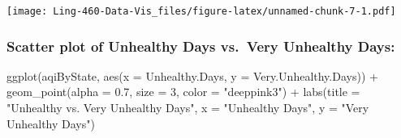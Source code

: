 \documentclass[
]{article}
\newenvironment{Shaded}{\begin{snugshade}}{\end{snugshade}}
\newcommand{\AttributeTok}[1]{\textcolor[rgb]{0.77,0.63,0.00}{#1}}
\newcommand{\DecValTok}[1]{\textcolor[rgb]{0.00,0.00,0.81}{#1}}
\newcommand{\FloatTok}[1]{\textcolor[rgb]{0.00,0.00,0.81}{#1}}
\newcommand{\FunctionTok}[1]{\textcolor[rgb]{0.00,0.00,0.00}{#1}}
\newcommand{\NormalTok}[1]{#1}
\newcommand{\OtherTok}[1]{\textcolor[rgb]{0.56,0.35,0.01}{#1}}
\newcommand{\SpecialCharTok}[1]{\textcolor[rgb]{0.00,0.00,0.00}{#1}}
\newcommand{\StringTok}[1]{\textcolor[rgb]{0.31,0.60,0.02}{#1}}
\begin{document}
\begin{Shaded}
\end{Shaded}

\texttt{[image: Ling-460-Data-Vis\_files/figure-latex/unnamed-chunk-7-1.pdf]}

\hypertarget{scatter-plot-of-unhealthy-days-vs.-very-unhealthy-days}{%
\subsubsection{Scatter plot of Unhealthy Days vs.~Very Unhealthy
Days:}\label{scatter-plot-of-unhealthy-days-vs.-very-unhealthy-days}}

\begin{Shaded}
\begin{Highlighting}[]
\FunctionTok{ggplot}\NormalTok{(aqiByState, }\FunctionTok{aes}\NormalTok{(}\AttributeTok{x =}\NormalTok{ Unhealthy.Days, }\AttributeTok{y =}\NormalTok{ Very.Unhealthy.Days)) }\SpecialCharTok{+}
  \FunctionTok{geom\_point}\NormalTok{(}\AttributeTok{alpha =} \FloatTok{0.7}\NormalTok{, }\AttributeTok{size =} \DecValTok{3}\NormalTok{, }\AttributeTok{color =} \StringTok{"deeppink3"}\NormalTok{) }\SpecialCharTok{+}
  \FunctionTok{labs}\NormalTok{(}\AttributeTok{title =} \StringTok{"Unhealthy vs. Very Unhealthy Days"}\NormalTok{,}
       \AttributeTok{x =} \StringTok{"Unhealthy Days"}\NormalTok{, }\AttributeTok{y =} \StringTok{"Very Unhealthy Days"}\NormalTok{)}
\end{Highlighting}
\end{Shaded}
\end{document}
